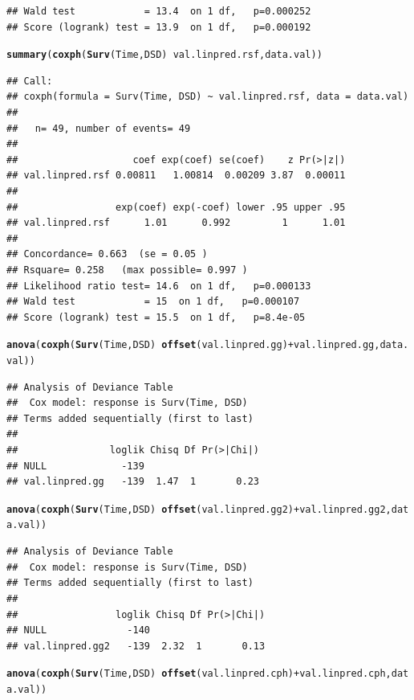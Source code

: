 \documentclass{article}\usepackage[]{graphicx}\usepackage[]{color}
\makeatletter
\newcommand{\hlopt}[1]{\textcolor[rgb]{0,0,0}{#1}}%
\newcommand{\hlstd}[1]{\textcolor[rgb]{0.345,0.345,0.345}{#1}}%
\newcommand{\hlkwd}[1]{\textcolor[rgb]{0.737,0.353,0.396}{\textbf{#1}}}%
\newenvironment{kframe}{%
 \def\at@end@of@kframe{}%
 \ifinner\ifhmode%
  \def\at@end@of@kframe{\end{minipage}}%
  \begin{minipage}{\columnwidth}%
 \fi\fi%
 \def\FrameCommand##1{\hskip\@totalleftmargin \hskip-\fboxsep
 \colorbox{shadecolor}{##1}\hskip-\fboxsep
     \hskip-\linewidth \hskip-\@totalleftmargin \hskip\columnwidth}%
 \MakeFramed {\advance\hsize-\width
   \@totalleftmargin\z@ \linewidth\hsize
   \@setminipage}}%
 {\par\unskip\endMakeFramed%
 \at@end@of@kframe}
\newenvironment{knitrout}{}{} %
\makeatother
\begin{document}
\begin{knitrout}
\begin{kframe}
\begin{verbatim}
## Wald test            = 13.4  on 1 df,   p=0.000252
## Score (logrank) test = 13.9  on 1 df,   p=0.000192
\end{verbatim}
\begin{alltt}
\hlkwd{summary}\hlstd{(}\hlkwd{coxph}\hlstd{(}\hlkwd{Surv}\hlstd{(Time, DSD)} \hlopt{~} \hlstd{val.linpred.rsf, data.val))}
\end{alltt}
\begin{verbatim}
## Call:
## coxph(formula = Surv(Time, DSD) ~ val.linpred.rsf, data = data.val)
## 
##   n= 49, number of events= 49 
## 
##                    coef exp(coef) se(coef)    z Pr(>|z|)
## val.linpred.rsf 0.00811   1.00814  0.00209 3.87  0.00011
## 
##                 exp(coef) exp(-coef) lower .95 upper .95
## val.linpred.rsf      1.01      0.992         1      1.01
## 
## Concordance= 0.663  (se = 0.05 )
## Rsquare= 0.258   (max possible= 0.997 )
## Likelihood ratio test= 14.6  on 1 df,   p=0.000133
## Wald test            = 15  on 1 df,   p=0.000107
## Score (logrank) test = 15.5  on 1 df,   p=8.4e-05
\end{verbatim}
\begin{alltt}
\hlkwd{anova}\hlstd{(}\hlkwd{coxph}\hlstd{(}\hlkwd{Surv}\hlstd{(Time, DSD)} \hlopt{~} \hlkwd{offset}\hlstd{(val.linpred.gg)} \hlopt{+} \hlstd{val.linpred.gg, data.val))}
\end{alltt}
\begin{verbatim}
## Analysis of Deviance Table
##  Cox model: response is Surv(Time, DSD)
## Terms added sequentially (first to last)
## 
##                loglik Chisq Df Pr(>|Chi|)
## NULL             -139                    
## val.linpred.gg   -139  1.47  1       0.23
\end{verbatim}
\begin{alltt}
\hlkwd{anova}\hlstd{(}\hlkwd{coxph}\hlstd{(}\hlkwd{Surv}\hlstd{(Time, DSD)} \hlopt{~} \hlkwd{offset}\hlstd{(val.linpred.gg2)} \hlopt{+} \hlstd{val.linpred.gg2, data.val))}
\end{alltt}
\begin{verbatim}
## Analysis of Deviance Table
##  Cox model: response is Surv(Time, DSD)
## Terms added sequentially (first to last)
## 
##                 loglik Chisq Df Pr(>|Chi|)
## NULL              -140                    
## val.linpred.gg2   -139  2.32  1       0.13
\end{verbatim}
\begin{alltt}
\hlkwd{anova}\hlstd{(}\hlkwd{coxph}\hlstd{(}\hlkwd{Surv}\hlstd{(Time, DSD)} \hlopt{~} \hlkwd{offset}\hlstd{(val.linpred.cph)} \hlopt{+} \hlstd{val.linpred.cph, data.val))}

\end{alltt}
\end{kframe}
\end{knitrout}
\end{document}
